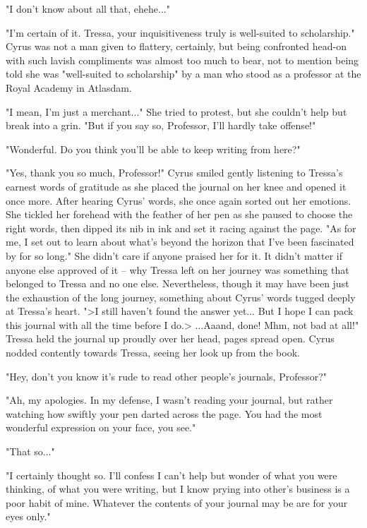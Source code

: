 "I don't know about all that, ehehe..."

"I'm certain of it. Tressa, your inquisitiveness truly is well-suited to scholarship." Cyrus was not a man given to flattery, certainly, but being confronted head-on with such lavish compliments was almost too much to bear, not to mention being told she was "well-suited to scholarship" by a man who stood as a professor at the Royal Academy in Atlasdam.

"I mean, I'm just a merchant..." She tried to protest, but she couldn't help but break into a grin. "But if you say so, Professor, I'll hardly take offense!"

"Wonderful. Do you think you'll be able to keep writing from here?"

"Yes, thank you so much, Professor!" Cyrus smiled gently listening to Tressa's earnest words of gratitude as she placed the journal on her knee and opened it once more. After hearing Cyrus' words, she once again sorted out her emotions. She tickled her forehead with the feather of her pen as she paused to choose the right words, then dipped its nib in ink and set it racing against the page. "As for me, I set out to learn about what's beyond the horizon that I've been fascinated by for so long." She didn't care if anyone praised her for it. It didn't matter if anyone else approved of it -- why Tressa left on her journey was something that belonged to Tressa and no one else. Nevertheless, though it may have been just the exhaustion of the long journey, something about Cyrus' words tugged deeply at Tressa's heart. ">I still haven't found the answer yet... But I hope I can pack this journal with all the time before I do.> ...Aaand, done! Mhm, not bad at all!" Tressa held the journal up proudly over her head, pages spread open. Cyrus nodded contently towards Tressa, seeing her look up from the book.

"Hey, don't you know it's rude to read other people's journals, Professor?"

"Ah, my apologies. In my defense, I wasn't reading your journal, but rather watching how swiftly your pen darted across the page. You had the most wonderful expression on your face, you see."

"That so..."

"I certainly thought so. I'll confess I can't help but wonder of what you were thinking, of what you were writing, but I know prying into other's business is a poor habit of mine. Whatever the contents of your journal may be are for your eyes only."

